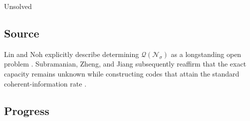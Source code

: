 Unsolved

\subsection*{Source}

Lin and Noh explicitly describe determining
$\mathcal Q(\mathcal N_\sigma)$ as a longstanding open problem
.  Subramanian, Zheng, and Jiang subsequently
reaffirm that the exact capacity remains unknown while constructing codes
that attain the standard coherent-information rate
.

\subsection*{Progress}

